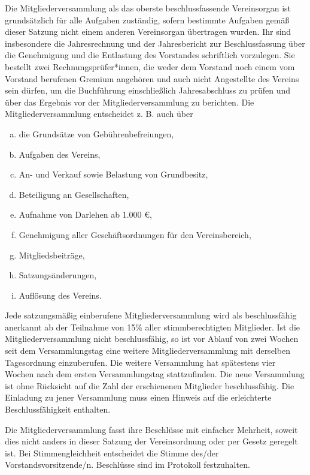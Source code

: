 \begin{contract}
    Die Mitgliederversammlung als das oberste beschlussfassende Vereinsorgan ist grundsätzlich für alle Aufgaben zuständig, sofern bestimmte Aufgaben gemäß dieser Satzung nicht einem anderen Vereinsorgan übertragen wurden. Ihr sind insbesondere die Jahresrechnung und der Jahresbericht zur Beschlussfassung über die Genehmigung und die Entlastung des Vorstandes schriftlich vorzulegen. Sie bestellt zwei Rechnungsprüfer*innen, die weder dem Vorstand noch einem vom Vorstand berufenen Gremium angehören und auch nicht Angestellte des Vereins sein dürfen, um die Buchführung einschließlich Jahresabschluss zu prüfen und über das Ergebnis vor der Mitgliederversammlung zu berichten. Die Mitgliederversammlung entscheidet z. B. auch über
    \begin{enumerate}[(a)]
        \item die Grundsätze von Gebührenbefreiungen,
        \item Aufgaben des Vereins,
        \item An- und Verkauf sowie Belastung von Grundbesitz,
        \item Beteiligung an Gesellschaften,
        \item Aufnahme von Darlehen ab 1.000 €,
        \item Genehmigung aller Geschäftsordnungen für den Vereinsbereich,
        \item Mitgliedsbeiträge,
        \item Satzungsänderungen,
        \item Auflösung des Vereins.
    \end{enumerate}

    Jede satzungsmäßig einberufene Mitgliederversammlung wird als beschlussfähig anerkannt ab der Teilnahme von 15\% aller stimmberechtigten Mitglieder. Ist die Mitgliederversammlung nicht beschlussfähig, so ist vor Ablauf von zwei Wochen seit dem Versammlungstag eine weitere Mitgliederversammlung mit derselben Tagesordnung einzuberufen. Die weitere Versammlung hat spätestens vier Wochen nach dem ersten Versammlungstag stattzufinden. Die neue Versammlung ist ohne Rücksicht auf die Zahl der erschienenen Mitglieder beschlussfähig. Die Einladung zu jener Versammlung muss einen Hinweis auf die erleichterte Beschlussfähigkeit enthalten.

    Die Mitgliederversammlung fasst ihre Beschlüsse mit einfacher Mehrheit, soweit dies nicht anders in dieser Satzung der Vereinsordnung oder per Gesetz geregelt ist. Bei Stimmengleichheit entscheidet die Stimme des/der Vorstandsvorsitzende/n. Beschlüsse sind im Protokoll festzuhalten.
    \label{abstimmungsart}


\end{contract}
